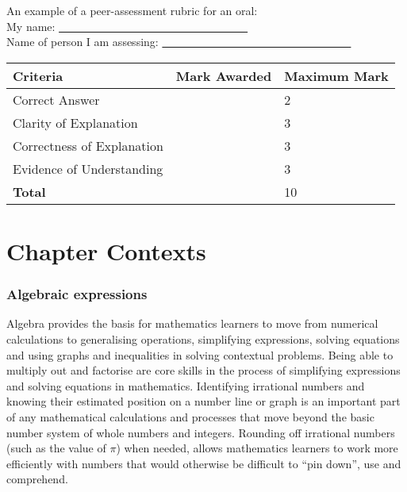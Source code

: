 An example of a peer-assessment rubric for an oral: \\
My name: \underline{~~~~~~~~~~~~~~~~~~~~~~~~~~~~~~~~~~}\\
Name of person I am assessing: \underline{~~~~~~~~~~~~~~~~~~~~~~~~~~~~~~~~~~}\\

\begin{table}[H]
 \begin{center}
  \begin{tabular}{|p{5cm}|p{2.5cm}|p{2.5cm}|} \hline
  \textbf{Criteria} & \textbf{Mark Awarded} & \textbf{Maximum Mark}\\ \hline
Correct Answer &&2\\ \hline
Clarity of Explanation&&3\\ \hline
Correctness of Explanation  &&3\\ \hline
Evidence of Understanding &&3\\ \hline
\textbf{Total} &&10\\ \hline

  \end{tabular}

 \end{center}

\end{table}

\section{Chapter Contexts}
\subsubsection{Algebraic expressions}
Algebra provides the basis for mathematics learners to move from numerical calculations to generalising operations, simplifying expressions, solving equations and using graphs and inequalities in solving contextual problems. Being able to multiply out and factorise are core skills in the process of simplifying expressions and solving equations in mathematics. Identifying irrational numbers and knowing their estimated position on a number line or graph is an important part of any mathematical calculations and processes that move beyond the basic number system of whole numbers and integers. Rounding off irrational numbers (such as the value of $\pi$) when needed, allows mathematics learners to work more efficiently with numbers that would otherwise be difficult to “pin down”, use and comprehend.  \par

